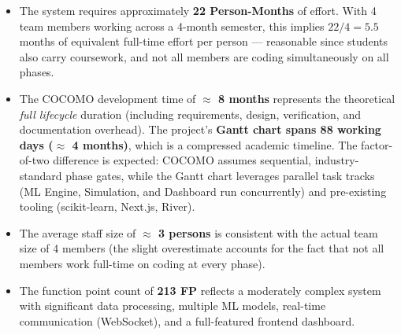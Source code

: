 \documentclass[11pt, a4paper]{article}
\begin{document}
\begin{itemize}
    \item The system requires approximately \textbf{22 Person-Months} of effort. With 4 team members working across a 4-month semester, this implies $22 / 4 = 5.5$ months of equivalent full-time effort per person --- reasonable since students also carry coursework, and not all members are coding simultaneously on all phases.
    \item The COCOMO development time of \textbf{$\approx$ 8 months} represents the theoretical \emph{full lifecycle} duration (including requirements, design, verification, and documentation overhead). The project's \textbf{Gantt chart spans 88 working days ($\approx$ 4 months)}, which is a compressed academic timeline. The factor-of-two difference is expected: COCOMO assumes sequential, industry-standard phase gates, while the Gantt chart leverages parallel task tracks (ML Engine, Simulation, and Dashboard run concurrently) and pre-existing tooling (scikit-learn, Next.js, River).
    \item The average staff size of \textbf{$\approx$ 3 persons} is consistent with the actual team size of 4 members (the slight overestimate accounts for the fact that not all members work full-time on coding at every phase).
    \item The function point count of \textbf{213 FP} reflects a moderately complex system with significant data processing, multiple ML models, real-time communication (WebSocket), and a full-featured frontend dashboard.
\end{itemize}
\end{document}
